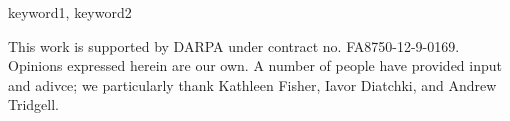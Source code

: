 \documentclass{sigplanconf}
\begin{document}
\keywords
keyword1, keyword2



















\acks

This work is supported by DARPA under contract no. FA8750-12-9-0169.  Opinions
expressed herein are our own.  A number of people have provided input and
adivce; we particularly thank Kathleen Fisher, Iavor Diatchki, and Andrew
Tridgell.








\end{document}
